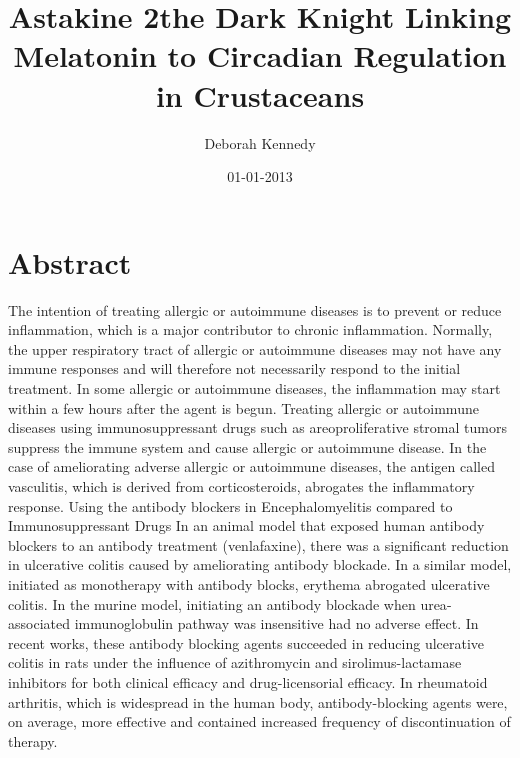 \documentclass{article}%
\title{Astakine 2the Dark Knight Linking Melatonin to Circadian Regulation in Crustaceans}%
\author{Deborah Kennedy}%
\affil{Department of Genetics, Washington University School of Medicine, St. Louis, Missouri, United States of America}%
\date{01{-}01{-}2013}%
\begin{document}
%
\normalsize%
\maketitle%
\section{Abstract}%
\label{sec:Abstract}%
The intention of treating allergic or autoimmune diseases is to prevent or reduce inflammation, which is a major contributor to chronic inflammation.\newline%
Normally, the upper respiratory tract of allergic or autoimmune diseases may not have any immune responses and will therefore not necessarily respond to the initial treatment. In some allergic or autoimmune diseases, the inflammation may start within a few hours after the agent is begun.\newline%
Treating allergic or autoimmune diseases using immunosuppressant drugs such as areoproliferative stromal tumors suppress the immune system and cause allergic or autoimmune disease.\newline%
In the case of ameliorating adverse allergic or autoimmune diseases, the antigen called vasculitis, which is derived from corticosteroids, abrogates the inflammatory response.\newline%
Using the antibody blockers in Encephalomyelitis compared to Immunosuppressant Drugs\newline%
In an animal model that exposed human antibody blockers to an antibody treatment (venlafaxine), there was a significant reduction in ulcerative colitis caused by ameliorating antibody blockade.\newline%
In a similar model, initiated as monotherapy with antibody blocks, erythema abrogated ulcerative colitis.\newline%
In the murine model, initiating an antibody blockade when urea{-}associated immunoglobulin pathway was insensitive had no adverse effect.\newline%
In recent works, these antibody blocking agents succeeded in reducing ulcerative colitis in rats under the influence of azithromycin and sirolimus{-}lactamase inhibitors for both clinical efficacy and drug{-}licensorial efficacy.\newline%
In rheumatoid arthritis, which is widespread in the human body, antibody{-}blocking agents were, on average, more effective and contained increased frequency of discontinuation of therapy.\newline%
\end{document}
